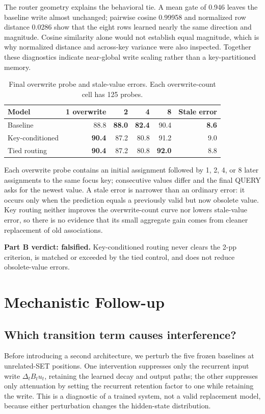 \documentclass[10pt,a4paper]{article}
\begin{document}
The router geometry explains the behavioral tie. A mean gate of 0.946 leaves the baseline write almost unchanged; pairwise cosine 0.99958 and normalized row distance 0.0286 show that the eight rows learned nearly the same direction and magnitude. Cosine similarity alone would not establish equal magnitude, which is why normalized distance and across-key variance were also inspected. Together these diagnostics indicate near-global write scaling rather than a key-partitioned memory.

\begin{table}[!htbp]
\centering\small
\caption{Final overwrite probe and stale-value errors. Each overwrite-count cell has 125 probes.}
\begin{tabular}{lrrrrr}
\toprule
Model & 1 overwrite & 2 & 4 & 8 & Stale error \\
\midrule
Baseline & 88.8 & \textbf{88.0} & \textbf{82.4} & 90.4 & \textbf{8.6} \\
Key-conditioned & \textbf{90.4} & 87.2 & 80.8 & 91.2 & 9.0 \\
Tied routing & \textbf{90.4} & 87.2 & 80.8 & \textbf{92.0} & 8.8 \\
\bottomrule
\end{tabular}
\end{table}
Each overwrite probe contains an initial assignment followed by 1, 2, 4, or 8 later assignments to the same focus key; consecutive values differ and the final QUERY asks for the newest value. A stale error is narrower than an ordinary error: it occurs only when the prediction equals a previously valid but now obsolete value. Key routing neither improves the overwrite-count curve nor lowers stale-value error, so there is no evidence that its small aggregate gain comes from cleaner replacement of old associations.
\begin{center}
\small\colorbox{softred}{\parbox{0.93\linewidth}{\textbf{Part B verdict: falsified.} Key-conditioned routing never clears the 2-pp criterion, is matched or exceeded by the tied control, and does not reduce obsolete-value errors.}}
\end{center}

\section{Mechanistic Follow-up}
\subsection{Which transition term causes interference?}
Before introducing a second architecture, we perturb the five frozen baselines at unrelated-SET positions. One intervention suppresses only the recurrent input write \(\Delta_tB_tu_t\), retaining the learned decay and output paths; the other suppresses only attenuation by setting the recurrent retention factor to one while retaining the write. This is a diagnostic of a trained system, not a valid replacement model, because either perturbation changes the hidden-state distribution.
\end{document}
